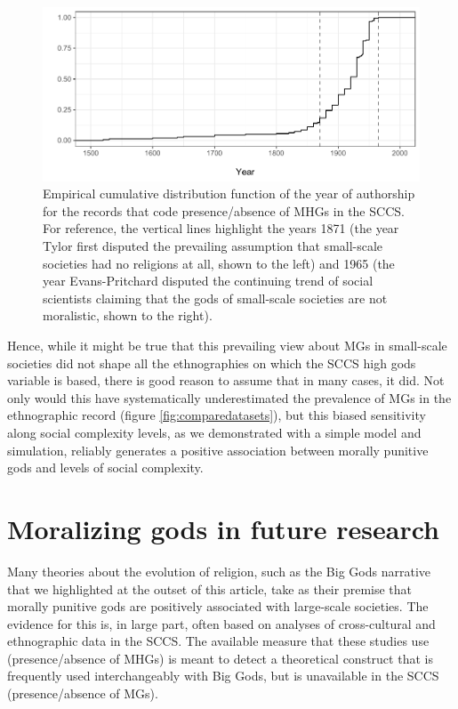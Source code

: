 \documentclass[
]{article}
\begin{document}
\begin{figure}
\centering
\includegraphics{mhg-writeup_files/figure-latex/sccsYearPlot-1.pdf}
\caption{\label{fig:sccsYearPlot}Empirical cumulative distribution function of the year of authorship for the records that code presence/absence of MHGs in the SCCS. For reference, the vertical lines highlight the years 1871 (the year Tylor first disputed the prevailing assumption that small-scale societies had no religions at all, shown to the left) and 1965 (the year Evans-Pritchard disputed the continuing trend of social scientists claiming that the gods of small-scale societies are not moralistic, shown to the right).}
\end{figure}

Hence, while it might be true that this prevailing view about MGs in small-scale societies did not shape all the ethnographies on which the SCCS high gods variable is based, there is good reason to assume that in many cases, it did. Not only would this have systematically underestimated the prevalence of MGs in the ethnographic record (figure \ref{fig:comparedatasets}), but this biased sensitivity along social complexity levels, as we demonstrated with a simple model and simulation, reliably generates a positive association between morally punitive gods and levels of social complexity.

\section{Moralizing gods in future research}

Many theories about the evolution of religion, such as the Big Gods narrative that we highlighted at the outset of this article, take as their premise that morally punitive gods are positively associated with large-scale societies. The evidence for this is, in large part, often based on analyses of cross-cultural and ethnographic data in the SCCS. The available measure that these studies use (presence/absence of MHGs) is meant to detect a theoretical construct that is frequently used interchangeably with Big Gods, but is unavailable in the SCCS (presence/absence of MGs).
\end{document}
